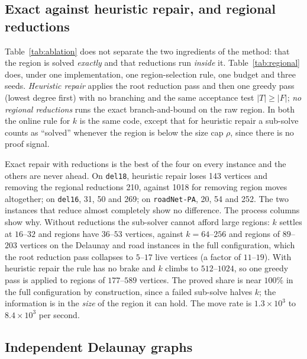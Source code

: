 \documentclass[review,authoryear,11pt]{elsarticle}
\theoremstyle{definition}
\begin{document}


\subsection{Exact against heuristic repair, and regional reductions}
\label{sec:regional}

Table~\ref{tab:ablation} does not separate the two ingredients of the method: that the
region is solved \emph{exactly} and that reductions run \emph{inside} it.
Table~\ref{tab:regional} does, under one implementation, one region-selection rule, one
budget and three seeds. \emph{Heuristic repair} applies the root reduction pass and then
one greedy pass (lowest degree first) with no branching and the same acceptance test
$|T|\ge|F|$; \emph{no regional reductions} runs the exact branch-and-bound on the raw
region. In both the online rule for $k$ is the same code, except that for heuristic
repair a sub-solve counts as ``solved'' whenever the region is below the size cap
$\rho$, since there is no proof signal.



Exact repair with reductions is the best of the four on every instance and the others
are never ahead. On \texttt{del18}, heuristic repair loses 143 vertices and removing the
regional reductions 210, against 1018 for removing region moves altogether; on
\texttt{del16}, 31, 50 and 269; on \texttt{roadNet-PA}, 20, 54 and 252. The two
instances that reduce almost completely show no difference. The process columns show
why. Without reductions the sub-solver cannot afford large regions: $k$ settles at
$16$--$32$ and regions have $36$--$53$ vertices, against $k=64$--$256$ and regions of
$89$--$203$ vertices on the Delaunay and road instances in the full configuration, which
the root reduction pass collapses to $5$--$17$ live vertices (a factor of $11$--$19$).
With heuristic repair the rule has no brake and $k$ climbs to $512$--$1024$, so one
greedy pass is applied to regions of $177$--$589$ vertices. The proved share is near
$100\%$ in the full configuration by construction, since a failed sub-solve halves $k$;
the information is in the \emph{size} of the region it can hold. The move rate is
$1.3\times10^3$ to $8.4\times10^3$ per second.

\subsection{Independent Delaunay graphs}
\label{sec:delaunay}
\end{document}
